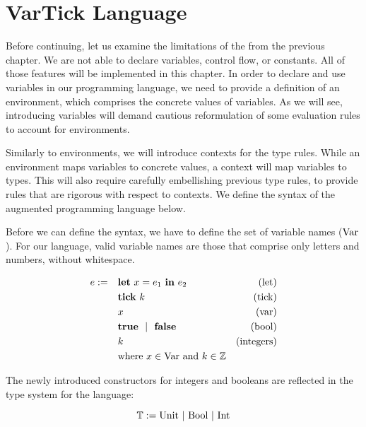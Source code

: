 \chapter{VarTick Language}\label{chap:VarTick}

Before continuing, let us examine the limitations of the  from the previous chapter. We are not able to declare variables, control flow, or constants. All of those features will be implemented in this chapter. In order to declare and use variables in our programming language, we need to provide a definition of an environment, which comprises the concrete values of variables. As we will see, introducing variables will demand cautious reformulation of some evaluation rules to account for environments.

Similarly to environments, we will introduce contexts for the type rules. While an environment maps variables to concrete values, a context will map variables to types. This will also require carefully embellishing previous type rules, to provide rules that are rigorous with respect to contexts. We define the syntax of the augmented programming language below.

Before we can define the syntax, we have to define the set of variable names (\(\text{Var}\)). For our language, valid variable names are those that comprise only letters and numbers, without whitespace. 

\begin{definition}
   \label{def:prog-lang-5}

\begin{align*}
   e := ~~~ & \mathbf{let}~x = e_1~\mathbf{in}~e_2		& \text{(let)}\\
            & \mathbf{tick}~k				& \text{(tick)}\\
	    & x					& \text{(var)}\\
	    & \mathbf{true} ~~| ~~\mathbf{false}		& \text{(bool)}\\
	    & k					& \text{(integers)}\\
	    & \text{where } x \in \text{Var} \text{ and } k \in \mathbb{Z}
\end{align*}
\end{definition}

The newly introduced constructors for integers and booleans are reflected in the type system for the language:

\begin{definition}\label{def:type-system-5}
   \[
      \mathbb{T} := \text{Unit}~|~\text{\text{Bool}}~|~\text{\text{Int}}
   \]
\end{definition}

